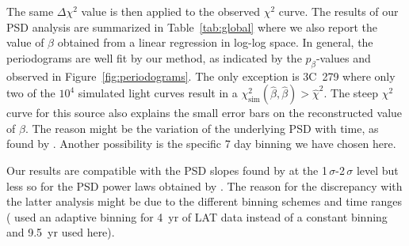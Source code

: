 \documentclass[twocolumn]{aastex62}
\begin{document}
The same $\Delta\chi^2$ value is then applied to the observed $\chi^2$ curve.
The results of our PSD analysis are summarized in Table~\ref{tab:global} where we also report the value of $\beta$ obtained from a linear regression in log-log space. 
In general, the periodograms are well fit by our method, as indicated by the $p_\beta$-values and observed in Figure~\ref{fig:periodograms}. 
The only exception is 3C~279 where only two of the $10^4$ simulated light curves result in a $\chi^2_\mathrm{sim}(\hat\beta,\hat\beta) > \hat\chi^2$.
The steep $\chi^2$ curve for this source also explains the small error bars on the reconstructed value of $\beta$.
The reason might be
the variation of the underlying PSD with time, as found by \citet{TheFermi-LAT:2016dss}. Another possibility is
the specific 7 day binning we have chosen here.

Our results are compatible with the PSD slopes found by \citet{2013ApJ...773..177N} at the 1\,$\sigma$-2\,$\sigma$ level but less so for the PSD power laws obtained by \citet{2014ApJ...786..143S}. 
The reason for the discrepancy with the latter analysis might be due to the different binning schemes and time ranges (\citealt{2014ApJ...786..143S} used an adaptive binning for 4~yr of LAT data instead of a constant binning and 9.5~yr used here). 
\end{document}
